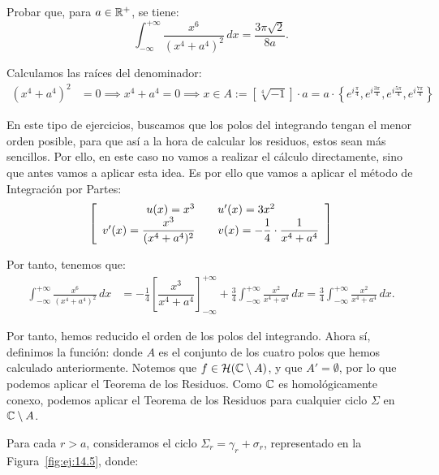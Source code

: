 \begin{ejercicio}\label{ej:14.5}
    Probar que, para $a \in \mathbb{R}^+$, se tiene:
    \begin{equation*}
        \int_{-\infty}^{+\infty} \frac{x^6}{(x^4 + a^4)^2} \, dx = \dfrac{3\pi\sqrt{2}}{8a}.
    \end{equation*}

    Calculamos las raíces del denominador:
    \begin{align*}
        (x^4 + a^4)^2 &= 0 \implies x^4 + a^4 = 0 \implies x\in A:=\left[\sqrt[4]{-1}\right]\cdot a = a\cdot \left\{e^{i\frac{\pi}{4}}, e^{i\frac{3\pi}{4}}, e^{i\frac{5\pi}{4}}, e^{i\frac{7\pi}{4}}\right\}
    \end{align*}

    En este tipo de ejercicios, buscamos que los polos del integrando tengan el menor orden posible, para que así a la hora de calcular los residuos, estos sean más sencillos. Por ello, en este caso no vamos a realizar el cálculo directamente, sino que antes vamos a aplicar esta idea. Es por ello que vamos a aplicar el método de Integración por Partes:
    \begin{equation*}
        \left[\begin{array}{c} u(x)=x^3\qquad u'(x)=3x^2 \\ v'(x)=\dfrac{x^3}{(x^4 + a^4)^2}\qquad v(x)=-\dfrac{1}{4}\cdot \dfrac{1}{x^4 + a^4} \end{array}\right]
    \end{equation*}

    Por tanto, tenemos que:
    \begin{align*}
        \int_{-\infty}^{+\infty} \frac{x^6}{(x^4 + a^4)^2} \, dx &= -\frac{1}{4}\left[\dfrac{x^3}{x^4 + a^4}\right]_{-\infty}^{+\infty} + \frac{3}{4}\int_{-\infty}^{+\infty} \frac{x^2}{x^4 + a^4} \, dx
        = \frac{3}{4}\int_{-\infty}^{+\infty} \frac{x^2}{x^4 + a^4} \, dx.
    \end{align*}

    Por tanto, hemos reducido el orden de los polos del integrando. Ahora sí, definimos la función:
    donde $A$ es el conjunto de los cuatro polos que hemos calculado anteriormente. Notemos que $f\in \mathcal{H}(\mathbb{C}\setminus A)$, y que $A'=\emptyset$, por lo que podemos aplicar el Teorema de los Residuos. Como $\mathbb{C}$ es homológicamente conexo, podemos aplicar el Teorema de los Residuos para cualquier ciclo $\Sigma$ en $\mathbb{C}\setminus A$.

    Para cada $r>a$, consideramos el ciclo $\Sigma_r = \gamma_r + \sigma_r$, representado en la Figura~\ref{fig:ej:14.5}, donde:
    \begin{figure}
        \centering
\end{figure}
\end{ejercicio}

